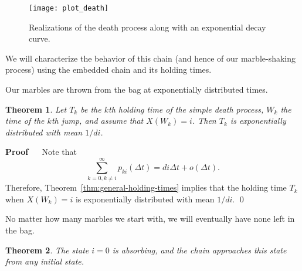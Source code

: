 \documentclass[12pt]{article}
\renewenvironment{proof}{%
\begin{adjustwidth}{\parindent}{\parindent}
{\bf Proof} \ \ 
}{\qed
\end{adjustwidth}}
\newtheorem{thm}{Theorem}[section]
\theoremstyle{definition}
\begin{document}
\begin{figure}[h]
    \centering
    \texttt{[image: plot\_death]}
    \caption{Realizations of the death process along with an exponential decay
    curve.}
    \label{fig:plot_death}
\end{figure}

We will characterize the behavior of this chain (and hence of our
marble-shaking process) using the embedded chain and its holding times.

Our marbles are thrown from the bag at exponentially distributed times.

\begin{thm}
    \label{thm:holding-time}
    Let $T_k$ be the $k$th holding time of the simple death process, $W_k$ the
    time of the $k$th jump, and assume that $X(W_k) = i$. Then $T_k$ is
    exponentially distributed with mean $1/di$.
\end{thm}

\begin{proof}
Note that $$\sum_{k = 0, k \neq i}^\infty p_{ki}(\Delta t) = di \Delta t +
o(\Delta t).$$ Therefore, Theorem~\ref{thm:general-holding-times} implies that
the holding time $T_k$ when $X(W_k) = i$ is exponentially distributed with mean
$1/di$.
\end{proof}

No matter how many marbles we start with, we will eventually have none left in
the bag.

\begin{thm}
    \label{thm:limit-behavior}
    The state $i = 0$ is absorbing, and the chain approaches this state from
    any initial state.
\end{thm}
\end{document}
